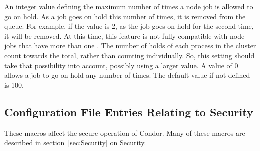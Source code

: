 \begin{description}
\label{param:DAGManMaxJobHolds}
\item[\Macro{DAGMAN\_MAX\_JOB\_HOLDS}]
  An integer value defining the maximum number of times a node job is
  allowed to go on hold. As a job goes on hold this number of
  times, it is removed from the queue.  For example, if the value
  is 2, as the job goes on hold for the second time,
  it will be removed.
  At this time, this feature is not fully compatible with node jobs
  that have more than one .
  The number of holds of each process in the cluster count towards the
  total, rather than counting individually.
  So, this setting should take that possibility into account,
  possibly using a larger value.
  A value of 0 allows a job to go on hold any number of times.
  The default value if not defined is 100.

\end{description}

\subsection{\label{sec:Config-Security}Configuration File Entries
Relating to Security}

These macros affect the secure operation of Condor.
Many of these macros are described in
section~\ref{sec:Security} on Security.

